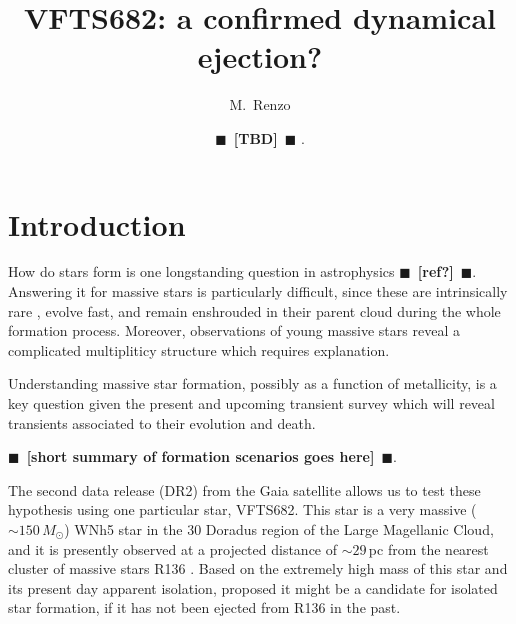 \documentclass{aa}
\newcommand{\todo}[1]{{\large $\blacksquare$~\textbf{\color{red}[#1]}}~$\blacksquare$}
\begin{document}
\title{VFTS682: a confirmed dynamical ejection?}

\author{M.~Renzo \and \todo{TBD}%
  .} 

  
\date{}
\abstract{}

\maketitle{}

\section{Introduction}
\label{sec:intro}

How do stars form is one longstanding question in astrophysics
\todo{ref?}. Answering it for massive stars is particularly difficult,
since these are intrinsically rare
\citep[e.g.,][]{salpeter:55,kroupa:01, schneider:18}, evolve fast, and
remain enshrouded in their parent cloud during the whole formation
process. Moreover, observations of young massive stars reveal a
complicated multipliticy structure which requires explanation.

Understanding massive star formation, possibly as a function
of metallicity, is a key question given the present and upcoming
transient survey \citep[e.g., LSST, BlackGem, LIGO/Virgo O3][]{} which will reveal transients associated to their
evolution and death.

\todo{short summary of formation scenarios goes here}.


The second data release (DR2) from the Gaia satellite
\cite[][]{brown:18,} allows us to test
these hypothesis using one particular star, VFTS682. This star is a
very massive ($\sim150\,M_\odot$) WNh5 star in the 30 Doradus region
of the Large Magellanic Cloud, and it is presently observed at a
projected distance of $\sim$$29$\,pc from the nearest cluster of
massive stars R136 \citep[][]{bestenlehner:11}. Based on the extremely high mass of this star and
its present day apparent isolation, \cite{bestenlehner:11} proposed it
might be a candidate for isolated star formation, if it has not been
ejected from R136 in the past.
\end{document}
